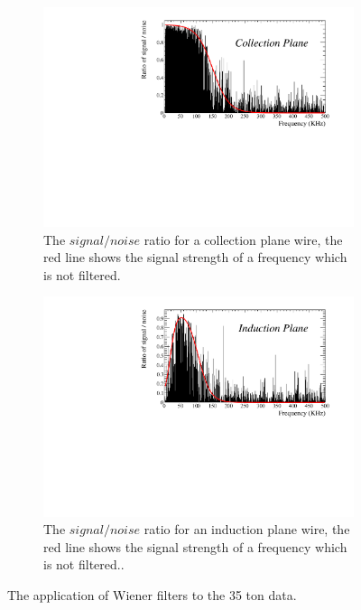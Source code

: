 \begin{figure}[h!]
\begin{subfigure}{0.45\textwidth}
    \centering
    \includegraphics[width=\textwidth]{Collection}
    \caption{The $signal/noise$ ratio for a collection plane wire, the red line shows the signal strength of a frequency which is not filtered.}
    \label{fig:FreqCollection}
  \end{subfigure}
  \hspace{0.08\textwidth}
  \begin{subfigure}{0.45\textwidth}
    \centering
    \includegraphics[width=\textwidth]{Induction}
    \caption{The $signal/noise$ ratio for an induction plane wire, the red line shows the signal strength of a frequency which is not filtered..}
    \label{fig:FreqInduction}
  \end{subfigure}
  \caption[Applying Wiener filters to the 35 ton data]{The application of Wiener filters to the 35 ton data.}
  \label{fig:FrequencyFilter}
\end{figure}

